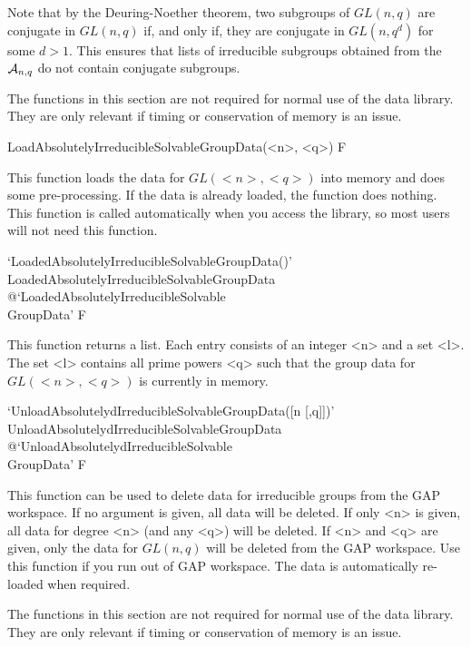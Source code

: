 Note that by the Deuring-Noether theorem, two subgroups of $GL(n, q)$ are
conjugate in $GL(n, q)$ if, and only if, they are conjugate in $GL(n, q^d)$
for some $d > 1$. This ensures that lists of irreducible subgroups obtained
from the ${\cal A}_{n,q}$ do not contain conjugate subgroups. 



The functions in this section are not required for normal use of the data library.
They are only relevant if timing or conservation of memory is an issue.

\>LoadAbsolutelyIrreducibleSolvableGroupData(<n>, <q>) F

This function loads the data for $GL(<n>, <q>)$ into memory and does some pre-processing. If the data
is already loaded, the function does nothing. This function is called automatically when you access the
{\IRREDSOL} library, so most users  will not need this function.

\>`LoadedAbsolutelyIrreducibleSolvableGroupData()'%
{LoadedAbsolutelyIrreducibleSolvableGroupData}%
@{`LoadedAbsolutelyIrreducibleSolvable\\GroupData'} F

This function returns a list. Each entry consists of an integer <n> and a set <l>. The set
<l> contains all prime powers <q> such that the group data for $GL(<n>, <q>)$ is currently in memory.

\>`UnloadAbsolutelydIrreducibleSolvableGroupData([n [,q]])'%
{UnloadAbsolutelydIrreducibleSolvableGroupData}%
@{`UnloadAbsolutelydIrreducibleSolvable\\GroupData'} F

This function can be used to delete data for irreducible groups from the GAP workspace. If no argument
is given, all data will be deleted. If only <n> is given, all data for degree <n> (and any <q>) will
be deleted. If <n> and <q> are given, only the data for $GL(n, q)$ will be deleted from the GAP
workspace. Use this function if you run out of GAP workspace. The
data is automatically re-loaded when required.



The functions in this section are not required for normal use of the data library.
They are only relevant if timing or conservation of memory is an issue.

